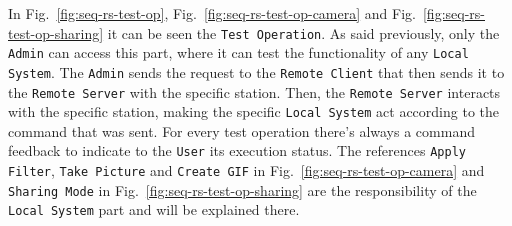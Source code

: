 In Fig.~\ref{fig:seq-rs-test-op}, Fig.~\ref{fig:seq-rs-test-op-camera} and Fig.~\ref{fig:seq-rs-test-op-sharing} it can be seen the \texttt{Test Operation}.
As said previously, only the \texttt{Admin} can access this part, where it can test the functionality of any \texttt{Local System}.
The \texttt{Admin} sends the request to the \texttt{Remote Client} that then sends it to the \texttt{Remote Server} with the specific station.
Then, the \texttt{Remote Server} interacts with the specific station, making the specific \texttt{Local System} act according to the command that was sent.
For every test operation there's always a command feedback to indicate to the
\texttt{User} its execution status.
The references \texttt{Apply Filter}, \texttt{Take Picture} and \texttt{Create GIF} in Fig.~\ref{fig:seq-rs-test-op-camera} and \texttt{Sharing Mode} in Fig.~\ref{fig:seq-rs-test-op-sharing} are the responsibility of the \texttt{Local System} part and will be explained there.
